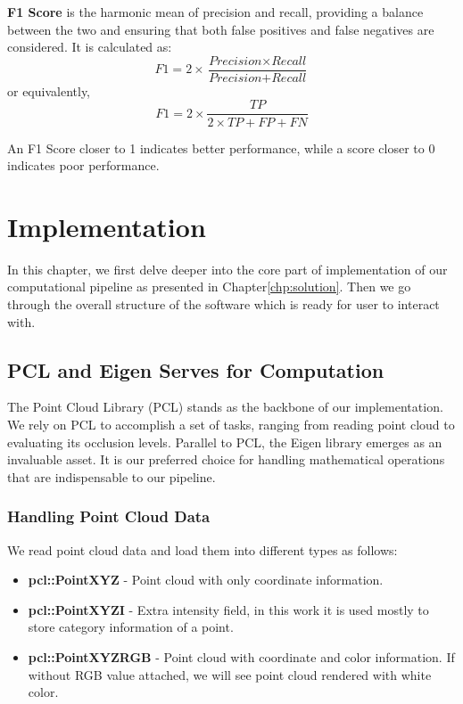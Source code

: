 \documentclass[11pt, a4paper,oneside,chapterprefix=false]{scrbook}
\begin{document}
\vspace{10pt}

\textbf{F1 Score} is the harmonic mean of precision and recall, providing a balance between the two and ensuring that both false positives and false negatives are considered. It is calculated as:
\[
    F1 = 2 \times \frac{\textit{Precision} \times \textit{Recall}}{\textit{Precision} + \textit{Recall}}
\]
or equivalently,
\[
    F1 = 2 \times \frac{TP}{2 \times TP + FP + FN}
\]

An F1 Score closer to 1 indicates better performance, while a score closer to 0 indicates poor performance.

\chapter{Implementation}\label{chp:implementation}

In this chapter, we first delve deeper into the core part of implementation of our computational pipeline as presented in Chapter\ref{chp:solution}. Then we go through the overall structure of the software which is ready for user to interact with.

\section{PCL and Eigen Serves for Computation}\label{sec:pcl and eigen}

The Point Cloud Library (PCL) stands as the backbone of our implementation. We rely on PCL to accomplish a set of tasks, ranging from reading point cloud to evaluating its occlusion levels. Parallel to PCL, the Eigen library emerges as an invaluable asset. It is our preferred choice for handling mathematical operations that are indispensable to our pipeline.

\subsection{Handling Point Cloud Data}

We read point cloud data and load them into different types as follows:

\begin{itemize}
    \item \textbf{pcl::PointXYZ} - Point cloud with only coordinate information.
    \item \textbf{pcl::PointXYZI} - Extra intensity field, in this work it is used mostly to store category information of a point.
    \item \textbf{pcl::PointXYZRGB} - Point cloud with coordinate and color information. If without RGB value attached, we will see point cloud rendered with white color.
\end{itemize}
\end{document}
